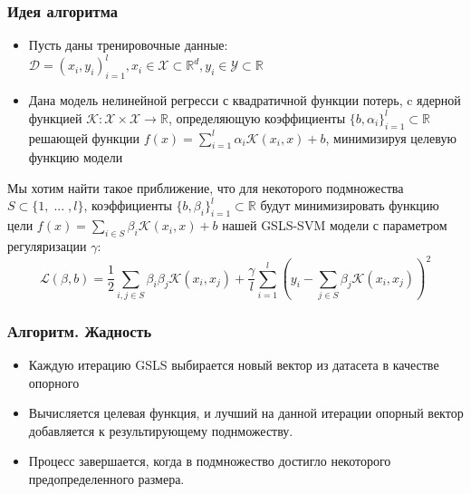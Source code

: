 \documentclass{beamer}
\begin{document}
\begin{frame}
	\frametitle{Идея алгоритма}

	\begin{itemize}
		\item Пусть даны тренировочные данные:
		      $ \mathcal{D} = {(x_i, y_i)}_{i = 1}^{l}, x_i \in \mathcal{X} \subset
			      \mathbb{R}^d, y_i \in \mathcal{Y} \subset \mathbb{R}$
		\item Дана модель нелинейной регресси с квадратичной функции потерь,
		      c ядерной функцией $\mathcal{K} : \mathcal{X} \times
			      \mathcal{X} \rightarrow \mathbb{R}$,
		      определяющую коэффициенты $\{b, \alpha_i\}_{i =
			      1}^{l} \subset \mathbb{R}$
		      решающей функции
		      $f(x) = \sum_{i = 1}^{l} \alpha_i \mathcal{K}(x_i,
			      x) + b$, минимизируя целевую функцию модели

	\end{itemize}

	Мы хотим найти такое приближение, что для некоторого
	подмножества $S \subset \{1, \; ... \; , l \}$, коэффициенты $\{b,
		\beta_i\}_{i=1}^{l} \subset \mathbb{R}$ будут минимизировать функцию
	цели $f(x) = \sum_{i \in S} \beta_i \mathcal{K}(x_i, x) + b$
	нашей GSLS-SVM модели с параметром регуляризации $\gamma$:
	\vspace{-10pt}
	\begin{equation*}
		\mathcal{L}(\beta, b) = \frac{1}{2} \sum_{i,j \in S} \beta_i \beta_j
		\mathcal{K}(x_i, x_j)
		+ \frac{\gamma}{l} \sum_{i=1}^{l} (y_i - \sum_{j \in S} \beta_j
		\mathcal{K}(x_i, x_j))^2
	\end{equation*}

\end{frame}

\begin{frame}
	\frametitle{Алгоритм. Жадность}
	\begin{itemize}
		\item Каждую итерацию GSLS выбирается новый вектор из датасета в качестве
		      опорного
		\item Вычисляется целевая функция, и лучший на данной итерации
		      опорный вектор добавляется к результирующему поднможеству.
		\item Процесс завершается, когда в подмножество достигло некоторого
		      предопределенного размера.
	\end{itemize}
\end{frame}
\end{document}
